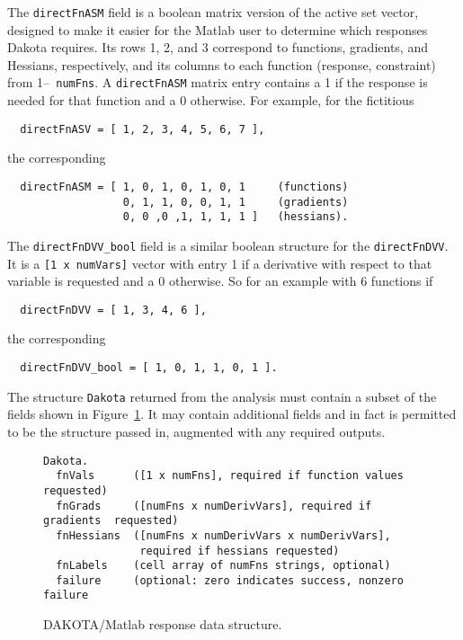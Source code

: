 The {\tt directFnASM} field is a boolean matrix version of the active
set vector, designed to make it easier for the Matlab user to
determine which responses Dakota requires.  Its rows 1, 2, and 3
correspond to functions, gradients, and Hessians, respectively, and
its columns to each function (response, constraint) from 1--{\tt
numFns}.  A {\tt directFnASM} matrix entry contains a 1 if the
response is needed for that function and a 0 otherwise.  For example,
for the fictitious
\begin{small}
\begin{verbatim}
  directFnASV = [ 1, 2, 3, 4, 5, 6, 7 ],
\end{verbatim}
\end{small}
the corresponding 
\begin{small}
\begin{verbatim}
  directFnASM = [ 1, 0, 1, 0, 1, 0, 1     (functions)
                  0, 1, 1, 0, 0, 1, 1     (gradients)
                  0, 0 ,0 ,1, 1, 1, 1 ]   (hessians).
\end{verbatim}
\end{small}
The {\tt directFnDVV\_bool} field is a similar boolean structure for
the {\tt directFnDVV}.  It is a {\tt [1 x numVars]} vector with entry
1 if a derivative with respect to that variable is requested and a 0
otherwise.  So for an example with 6 functions if
\begin{small}
\begin{verbatim}
  directFnDVV = [ 1, 3, 4, 6 ],
\end{verbatim}
\end{small}
the corresponding 
\begin{small}
\begin{verbatim}
  directFnDVV_bool = [ 1, 0, 1, 1, 0, 1 ].
\end{verbatim}
\end{small}

The structure {\tt Dakota} returned from the analysis must contain a
subset of the fields shown in
Figure~\ref{advint:figure:matlabresponse}.  It may contain additional
fields and in fact is permitted to be the structure passed in,
augmented with any required outputs.
\begin{figure} \centering
\begin{bigbox}
\begin{small}
\begin{verbatim}
Dakota.
  fnVals      ([1 x numFns], required if function values requested)
  fnGrads     ([numFns x numDerivVars], required if gradients  requested)
  fnHessians  ([numFns x numDerivVars x numDerivVars], 
               required if hessians requested)
  fnLabels    (cell array of numFns strings, optional)
  failure     (optional: zero indicates success, nonzero failure
\end{verbatim}
\end{small}
\end{bigbox}
\caption{DAKOTA/Matlab response data
structure.\label{advint:figure:matlabresponse}}
\end{figure}

